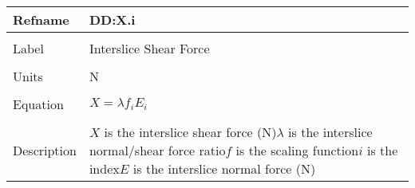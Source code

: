 \documentclass[12pt]{article}
\begin{document}
\noindent \begin{minipage}{\textwidth}
\begin{tabular}{p{} p{}}
\toprule \textbf{Refname} & \textbf{DD:X.i}
\label{DD:X.i}
\\ \midrule \\
Label & Interslice Shear Force
\\ \midrule \\
Units & N
\\ \midrule \\
Equation & $X=λ f_{i} E_{i}$
\\ \midrule \\
Description & $X$ is the interslice shear force (N)\newline$λ$ is the interslice normal/shear force ratio\newline$f$ is the scaling function\newline$i$ is the index\newline$E$ is the interslice normal force (N)
\\ \bottomrule \end{tabular}
\end{minipage}\\
~\newline
\end{document}
